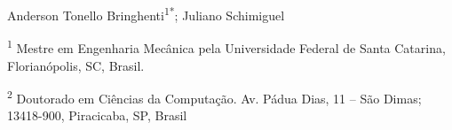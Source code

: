 \thispagestyle{empty}



\begin{center}
  {\sffamily\bfseries\fontsize{11}{11}\selectfont
  }

  \vspace{14pt}

  {\sffamily\fontsize{11}{11}\selectfont
    Anderson Tonello Bringhenti\textsuperscript{1*}; Juliano Schimiguel\par
  }
\end{center}

\vspace{14pt}

{\sffamily\fontsize{9}{9}\selectfont
  \noindent\textsuperscript{1} Mestre em Engenharia Mecânica pela Universidade Federal de Santa Catarina, Florianópolis, SC, Brasil.\par
  \noindent\textsuperscript{2} Doutorado em Ciências da Computação. Av. Pádua Dias, 11 -- São Dimas; 13418-900, Piracicaba, SP, Brasil\par
}







